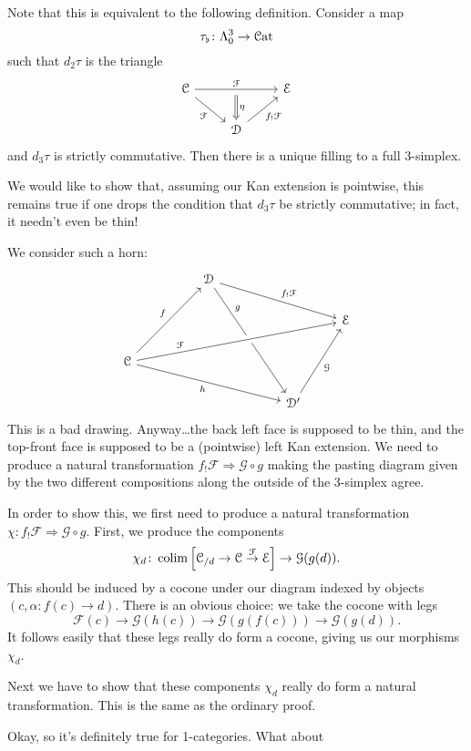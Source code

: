 \documentclass[main.tex]{subfiles}
\begin{document}
Note that this is equivalent to the following definition. Consider a map
\begin{equation*}
  \tau_{\flat}\colon \Lambda^{3}_{0} \to \mathcal{C}\mathrm{at}
\end{equation*}
such that $d_{2}\tau$ is the triangle
\begin{equation*}
  \begin{tikzcd}
    \category{C}
    \arrow[rr, "\mathcal{F}", ""{swap, name=M}]
    \arrow[dr, swap, "\mathcal{F}"]
    && \category{E}
    \\
    & \category{D}
    \arrow[ur, swap, "f_{!}\mathcal{F}"]
    \arrow[from=M, Rightarrow, "\eta"]
  \end{tikzcd}
\end{equation*}
and $d_{3}\tau$ is strictly commutative. Then there is a unique filling to a full 3-simplex.

We would like to show that, assuming our Kan extension is pointwise, this remains true if one drops the condition that $d_{3}\tau$ be strictly commutative; in fact, it needn't even be thin!

We consider such a horn:
\begin{equation*}
  \begin{tikzcd}
    && \category{D}
    \arrow[drrr, "f_{!}\mathcal{F}"]
    \arrow[dddrr, near start, "g"]
    \\
    &&&&& \category{E}
    \\
    \category{C}
    \arrow[uurr, "f"]
    \arrow[urrrrr, crossing over, near start, "\mathcal{F}", ""{name=CE}]
    \arrow[drrrr, swap, "h"]
    \\
    &&&& \category{D}'
    \arrow[uur, swap, "\mathcal{G}"]
  \end{tikzcd}
\end{equation*}
This is a bad drawing. Anyway\dots the back left face is supposed to be thin, and the top-front face is supposed to be a (pointwise) left Kan extension. We need to produce a natural transformation $f_{!}\mathcal{F} \Rightarrow \mathcal{G} \circ g$ making the pasting diagram given by the two different compositions along the outside of the 3-simplex agree.

In order to show this, we first need to produce a natural transformation $\chi\colon f_{!}\mathcal{F} \Rightarrow \mathcal{G} \circ g$. First, we produce the components
\begin{equation*}
  \chi_{d}\colon \operatorname*{colim}\left[ \mathcal{C}_{/d} \to \mathcal{C} \overset{\mathcal{F}}{\to} \mathcal{E} \right] \to \mathcal{G}(g(d)).
\end{equation*}
This should be induced by a cocone under our diagram indexed by objects $(c, \alpha\colon f(c) \to d)$. There is an obvious choice: we take the cocone with legs
\begin{equation*}
  \mathcal{F}(c) \to \mathcal{G}(h(c)) \to \mathcal{G}(g(f(c))) \to \mathcal{G}(g(d)).
\end{equation*}
It follows easily that these legs really do form a cocone, giving us our morphisms $\chi_{d}$.

Next we have to show that these components $\chi_{d}$ really do form a natural transformation. This is the same as the ordinary proof.


Okay, so it's definitely true for 1-categories. What about
\end{document}
